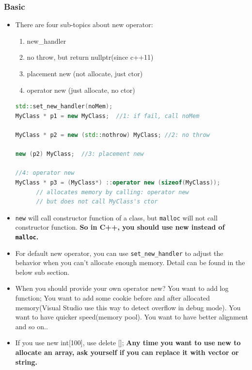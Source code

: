 \documentclass[a4paper,12pt,twoside]{book}
\begin{document}
\subsubsection{Basic}
\begin{itemize}

\item There are four sub-topics about new operator:
\begin{enumerate}
\item new\_handler
\item no throw, but return nullptr(since c++11)
\item placement new (not allocate, just ctor)
\item operator new (just allocate, no ctor)
\end{enumerate}

\begin{lstlisting}[frame=single, language=c++]
std::set_new_handler(noMem);
MyClass * p1 = new MyClass;  //1: if fail, call noMem

MyClass * p2 = new (std::nothrow) MyClass; //2: no throw

new (p2) MyClass;  //3: placement new

//4: operator new
MyClass * p3 = (MyClass*) ::operator new (sizeof(MyClass));
      // allocates memory by calling: operator new
      // but does not call MyClass's ctor
\end{lstlisting}

\item \texttt{new} will call constructor function of a class, but \texttt{malloc} will not call constructor function.  \textbf{So in C++, you should use new instead of \texttt{malloc}.}

\item For default new operator, you can use \texttt{set\_new\_handler} to adjust the behavior when you can't allocate enough memory. Detail can be found in the below sub section.

\item When you should provide your own operator new?  You want to add log function; You want to add some cookie before and after allocated memory(Visual Studio use this way to detect overflow in debug mode). You want to have quicker speed(memory pool). You want to have better alignment and so on..

\item If you use new int[100], use delete [];  \textbf{Any time you want to use new to allocate an array, ask yourself if you can replace it with vector or string.}
\end{itemize}
\end{document}
